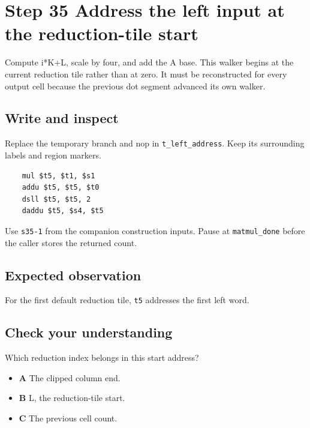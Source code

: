 \section{Step 35 Address the left input at the reduction-tile start}\label{matmul-s35}

Compute i*K+L, scale by four, and add the A base. This walker begins at the current reduction tile rather than at zero. It must be reconstructed for every output cell because the previous dot segment advanced its own walker.

\subsection{Write and inspect}
Replace the temporary branch and nop in \texttt{t\_left\_address}. Keep its surrounding labels and region markers.

\begin{verbatim}
    mul $t5, $t1, $s1
    addu $t5, $t5, $t0
    dsll $t5, $t5, 2
    daddu $t5, $s4, $t5
\end{verbatim}
Use \texttt{s35-1} from the companion construction inputs. Pause at \texttt{matmul\_done} before the caller stores the returned count.

\subsection{Expected observation}
For the first default reduction tile, \texttt{t5} addresses the first left word.

\subsection{Check your understanding}
Which reduction index belongs in this start address?

\begin{itemize}
  \item \textbf{A} The clipped column end.
  \item \textbf{B} L, the reduction-tile start.
  \item \textbf{C} The previous cell count.
\end{itemize}
